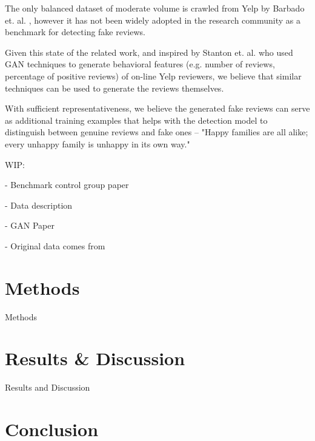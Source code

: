 \documentclass[conference]{IEEEtran} %
\theoremstyle{plain}
\theoremstyle{definition}
\begin{document}
The only balanced dataset of moderate volume is crawled from Yelp by Barbado et. al. \cite{barbado2019framework}, however it has not been widely adopted in the research community as a benchmark for detecting fake reviews.

Given this state of the related work, and inspired by Stanton et. al. \cite{stanton2019gans} who used GAN techniques to generate behavioral features (e.g. number of reviews, percentage of positive reviews) of on-line Yelp reviewers, we believe that similar techniques can be used to generate the reviews themselves.

With sufficient representativeness, we believe the generated fake reviews can serve as additional training examples that helps with the detection model to distinguish between genuine reviews and fake ones -- "Happy families are all alike; every unhappy family is unhappy in its own way."


WIP:

- Benchmark control group paper \cite{Tang2020}


- Data description \cite{wang2017handling}

- GAN Paper \cite{stanton2019gans}

- Original data comes from \cite{mukherjee2013fake} \cite{mukherjee2013yelp}


\section{Methods}
\label{methods}

Methods

\section{Results \& Discussion}
\label{results}

Results and Discussion

\section{Conclusion}
\label{conclusion}
\end{document}
